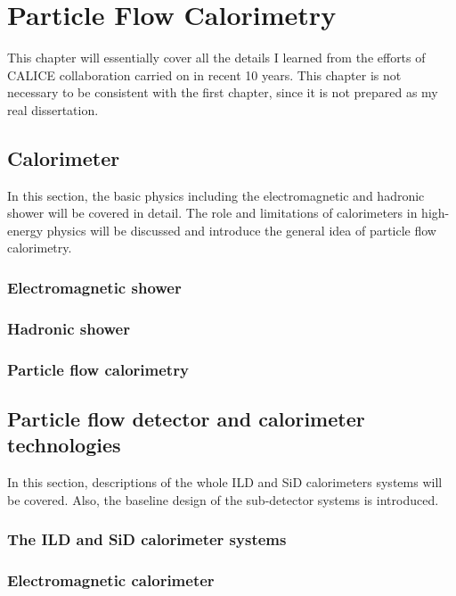 \chapter{Particle Flow Calorimetry}

\par This chapter will essentially cover all the details I learned from the efforts of CALICE collaboration carried on in recent 10 years. This chapter is not necessary to be consistent with the first chapter, since it is not prepared as my real dissertation.

\section{Calorimeter}
\par In this section, the basic physics including the electromagnetic and hadronic shower will be covered in detail. The role and limitations of calorimeters in high-energy physics will be discussed and introduce the general idea of particle flow calorimetry.
\subsection{Electromagnetic shower}

\subsection{Hadronic shower}

\subsection{Particle flow calorimetry}

\section{Particle flow detector and calorimeter technologies}
\par In this section, descriptions of the whole ILD and SiD calorimeters systems will be covered. Also, the baseline design of the sub-detector systems is introduced. 

\subsection{The ILD and SiD calorimeter systems}

\subsection{Electromagnetic calorimeter}

